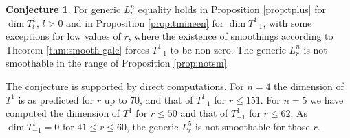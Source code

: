 \documentclass{amsart}
\renewcommand{\ell}{l}
\theoremstyle{definition}
\newtheorem{conj}[thm]{Conjecture}
\theoremstyle{remark}
\begin{document}
\begin{conj}\label{conj:equality} 
For generic $L_r^n$ equality holds in Proposition \ref{prop:tplus} for  $\dim T^1_\ell$, $\ell>0$ and in 
Proposition \ref{prop:tmineen} for $\dim T^1_{-1}$, 
with some exceptions for low values of $r$, where the
existence of smoothings according to Theorem  \ref{thm:smooth-gale} forces $T^1_{-1}$ to be non-zero.
The generic $L_r^n$ is not smoothable in the range of Proposition \ref{prop:notsm}.
\end{conj}

The conjecture is supported by direct computations.
For $n=4$ the dimension of $T^1$ is as predicted for $r$ up to 70, and that of $T^1_{-1}$
for $r\leq 151$. For $n=5$ we have computed the dimension of $T^1$ for $r\leq 50$
and that of $T^1_{-1}$ for $r\leq 62$. As $\dim T^1_{-1}=0$ for $41\leq r \leq 60$,
the generic $L_r^5$ is not smoothable for those $r$.
\end{document}
